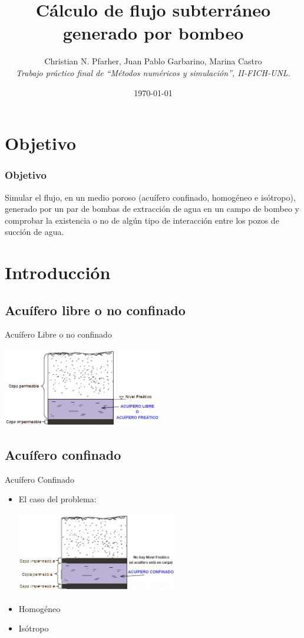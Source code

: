 \documentclass[spanish]{beamer}
\title{Cálculo de flujo subterráneo generado por bombeo}
\author{Christian N. Pfarher, Juan Pablo Garbarino, Marina Castro\\
\textit{Trabajo práctico final de ``Métodos numéricos y simulación'', II-FICH-UNL.}}
\date{\today}
\begin{document}
%
\frame{\titlepage}
%
\section{Objetivo}
\begin{frame}
  \frametitle{Objetivo}
Simular el flujo, en un medio poroso (acuífero confinado, homogéneo e isótropo), generado por un par de bombas de extracción de agua en un campo de bombeo y comprobar la existencia o no de algún tipo de interacción entre los pozos de succión de agua. 
\end{frame}
%
\section{Introducción}
	\subsection{Acuífero libre o no confinado}
		\begin{frame}{Acuífero Libre o no confinado}
			\begin{center}
				\includegraphics[width=7cm]{../img/libre}
			\end{center}
		\end{frame}

\subsection{Acuífero confinado}
	\begin{frame}{Acuífero Confinado}
	\begin{itemize}
		\item El caso del problema:
		\begin{center}
			\includegraphics[width=7cm]{../img/confinado}
		\end{center}
		\item Homogéneo
		\item Isótropo
	\end{itemize}
	\end{frame}
%
\end{document}
